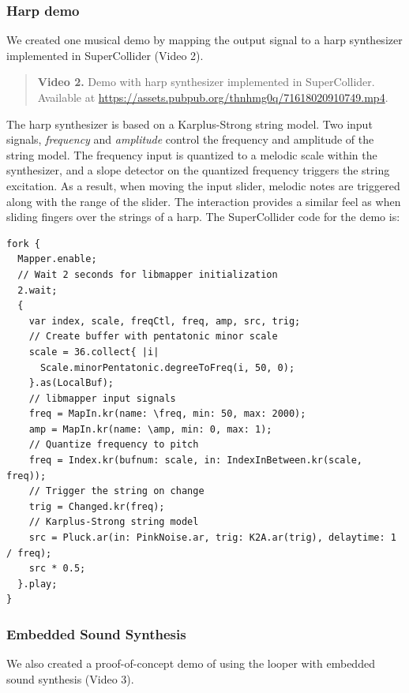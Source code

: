 \documentclass[sigconf]{nimeart}
\begin{document}
\subsubsection{Harp demo}\label{harp-demo}

We created one musical demo by mapping the output signal to a harp synthesizer implemented in SuperCollider (Video 2).


\begin{quote}\small\textbf{Video 2.} Demo with harp synthesizer implemented in SuperCollider. Available at \url{https://assets.pubpub.org/thnhmg0q/71618020910749.mp4}.\end{quote}


The harp synthesizer is based on a Karplus-Strong string model. Two input signals, \emph{frequency} and \emph{amplitude} control the frequency and amplitude of the string model. The frequency input is quantized to a melodic scale within the synthesizer, and a slope detector on the quantized frequency triggers the string excitation. As a result, when moving the input slider, melodic notes are triggered along with the range of the slider. The interaction provides a similar feel as when sliding fingers over the strings of a harp. The SuperCollider code for the demo is:

\begin{Verbatim}[breaklines=true,breakanywhere=true,fontsize=\footnotesize]
fork {
  Mapper.enable;
  // Wait 2 seconds for libmapper initialization
  2.wait;
  {
    var index, scale, freqCtl, freq, amp, src, trig;
    // Create buffer with pentatonic minor scale
    scale = 36.collect{ |i|
      Scale.minorPentatonic.degreeToFreq(i, 50, 0);
    }.as(LocalBuf);
    // libmapper input signals
    freq = MapIn.kr(name: \freq, min: 50, max: 2000);
    amp = MapIn.kr(name: \amp, min: 0, max: 1); 
    // Quantize frequency to pitch
    freq = Index.kr(bufnum: scale, in: IndexInBetween.kr(scale, freq));
    // Trigger the string on change
    trig = Changed.kr(freq);
    // Karplus-Strong string model 
    src = Pluck.ar(in: PinkNoise.ar, trig: K2A.ar(trig), delaytime: 1 / freq);
    src * 0.5;
  }.play;
}
\end{Verbatim}

\subsubsection{Embedded Sound Synthesis}\label{embedded-sound-synthesis}

We also created a proof-of-concept demo of using the looper with embedded sound synthesis (Video 3).
\end{document}
